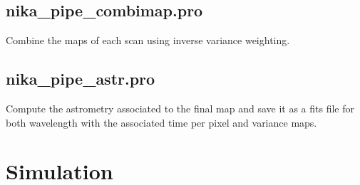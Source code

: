 \documentclass[a4paper]{article}
\begin{document}
\subsection{{\color{blue} nika\_pipe\_combimap.pro}}
Combine the maps of each scan using inverse variance weighting.

\subsection{{\color{blue} nika\_pipe\_astr.pro}}
Compute the astrometry associated to the final map and save it as a fits file for both wavelength with the associated time per pixel and variance maps.

\section{Simulation}
\label{sec:simu}
\end{document}
